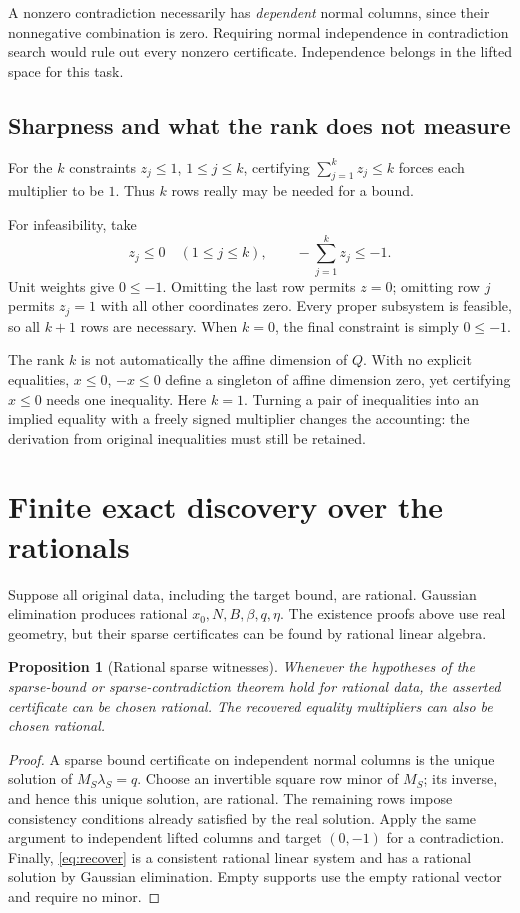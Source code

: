 \documentclass[11pt,letterpaper]{article}
\newtheorem{proposition}[theorem]{Proposition}
\theoremstyle{definition}
\theoremstyle{remark}
\numberwithin{equation}{section}
\begin{document}
A nonzero contradiction necessarily has \emph{dependent} normal columns,
since their nonnegative combination is zero. Requiring normal independence
in contradiction search would rule out every nonzero certificate.
Independence belongs in the lifted space for this task.

\subsection{Sharpness and what the rank does not measure}

For the \(k\) constraints \(z_j\le1\), \(1\le j\le k\), certifying
\(\sum_{j=1}^k z_j\le k\) forces each multiplier to be \(1\).
Thus \(k\) rows really may be needed for a bound.

For infeasibility, take
\[
 z_j\le0\quad(1\le j\le k),\qquad
 -\sum_{j=1}^k z_j\le-1.
\]
Unit weights give \(0\le-1\). Omitting the last row permits \(z=0\);
omitting row \(j\) permits \(z_j=1\) with all other coordinates zero.
Every proper subsystem is feasible, so all \(k+1\) rows are necessary.
When \(k=0\), the final constraint is simply \(0\le-1\).

The rank \(k\) is not automatically the affine dimension of \(Q\).
With no explicit equalities, \(x\le0\), \(-x\le0\) define a singleton of
affine dimension zero, yet certifying \(x\le0\) needs one inequality.
Here \(k=1\). Turning a pair of inequalities into an implied equality with a
freely signed multiplier changes the accounting: the derivation from
original inequalities must still be retained.

\section{Finite exact discovery over the rationals}
\label{sec:search}

Suppose all original data, including the target bound, are rational.
Gaussian elimination produces rational \(x_0,N,B,\beta,q,\eta\).
The existence proofs above use real geometry, but their sparse certificates
can be found by rational linear algebra.

\begin{proposition}[Rational sparse witnesses]\label{prop:rational}
Whenever the hypotheses of the sparse-bound or sparse-contradiction theorem
hold for rational data, the asserted certificate can be chosen rational.
The recovered equality multipliers can also be chosen rational.
\end{proposition}
\begin{proof}
A sparse bound certificate on independent normal columns is the unique
solution of \(M_S\lambda_S=q\). Choose an invertible square row minor of
\(M_S\); its inverse, and hence this unique solution, are rational.
The remaining rows impose consistency conditions already satisfied by
the real solution. Apply the same argument to independent lifted columns
and target \((0,-1)\) for a contradiction. Finally,
\eqref{eq:recover} is a consistent rational linear system and has a rational
solution by Gaussian elimination. Empty supports use the empty rational
vector and require no minor.
\end{proof}
\end{document}
